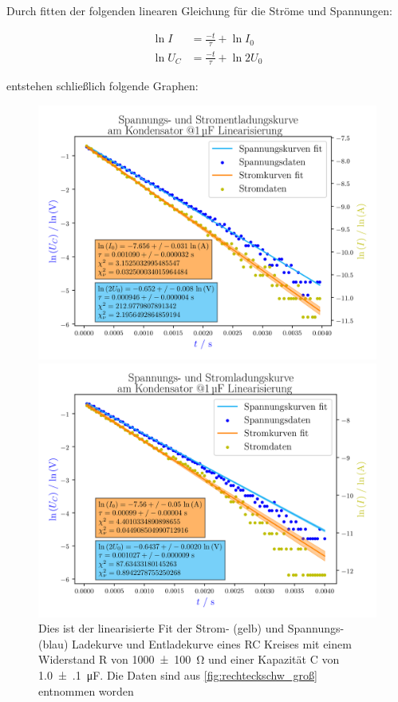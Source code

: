 \documentclass[11pt,ngerman]{scrartcl}
\begin{document}
Durch fitten der folgenden linearen Gleichung für die Ströme und Spannungen:

\begin{align*}
	\ln{I}   & = \frac{-t}{\tau} + \ln{I_0}  \\
	\ln{U_C} & = \frac{-t}{\tau} + \ln{2U_0}
\end{align*}

entstehen schließlich folgende Graphen:

\begin{figure}[H]
	\centering
	\begin{minipage}{0.49\textwidth}
		\includegraphics[width=\textwidth]{figures/entladekurve_linear}
	\end{minipage}
	\begin{minipage}{0.49\textwidth}
		\includegraphics[width=\textwidth]{figures/ladekurve_linear}
	\end{minipage}
	\caption{Dies ist der linearisierte Fit der Strom- (gelb) und Spannungs-
		(blau) Ladekurve und Entladekurve eines RC Kreises mit einem Widerstand R
		von \SI{1000(100)}{\ohm} und einer Kapazität C von
		\SI{1.0(1)}{\micro\farad}. Die Daten sind aus
		\autoref{fig:rechteckschw_groß} entnommen worden}
	\label{fig:linear_fit}
\end{figure}
\end{document}
